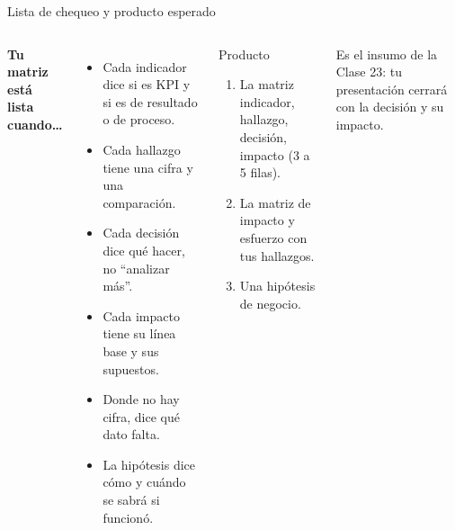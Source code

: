 \documentclass[aspectratio=169,11pt]{beamer}
\begin{document}
\begin{frame}[t]{Lista de chequeo y producto esperado}
  \begin{columns}[T,onlytextwidth]
    \small\textbf{Tu matriz está lista cuando\ldots}
    \vspace{0.05cm}
    \begin{itemize}
      \footnotesize
      \item[$\square$] Cada indicador dice si es KPI y si es de resultado o
        de proceso.
      \item[$\square$] Cada hallazgo tiene una cifra y una comparación.
      \item[$\square$] Cada decisión dice qué hacer, no ``analizar más''.
      \item[$\square$] Cada impacto tiene su línea base y sus supuestos.
      \item[$\square$] Donde no hay cifra, dice qué dato falta.
      \item[$\square$] La hipótesis dice cómo y cuándo se sabrá si
        funcionó.
    \end{itemize}
    \begin{exampleblock}{Producto}
      \footnotesize
      \begin{enumerate}
        \footnotesize
        \item La matriz indicador, hallazgo, decisión, impacto (3 a 5
          filas).
        \item La matriz de impacto y esfuerzo con tus hallazgos.
        \item Una hipótesis de negocio.
      \end{enumerate}
    \end{exampleblock}
    \footnotesize Es el insumo de la Clase 23: tu presentación cerrará con
    la decisión y su impacto.
  \end{columns}
\end{frame}

\end{document}
